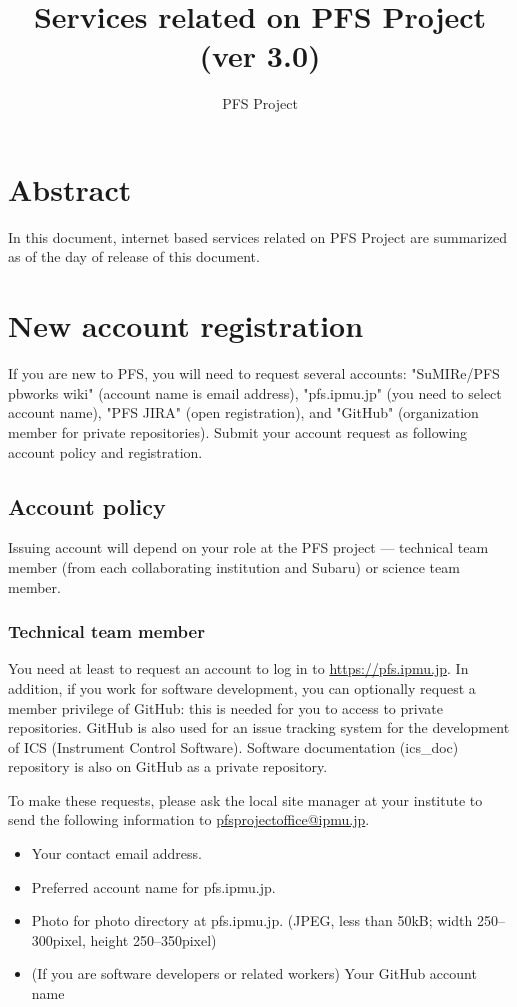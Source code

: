 \documentclass[a4paper,notitlepage]{article}
\title{Services related on PFS Project (ver 3.0)}
\author{PFS Project}
\begin{document}
\maketitle
\tableofcontents

\section{Abstract}

In this document, internet based services related on PFS Project are summarized 
as of the day of release of this document. 

\section{New account registration}

If you are new to PFS, you will need to request several accounts: 
"SuMIRe/PFS pbworks wiki" (account name is email address), 
"pfs.ipmu.jp" (you need to select account name), 
"PFS JIRA" (open registration), and 
"GitHub" (organization member for private repositories). 
Submit your account request as following account policy and registration. 

\subsection{Account policy}

Issuing account will depend on your role at the PFS project --- 
technical team member (from each collaborating institution and Subaru) 
or science team member. 

\subsubsection{Technical team member}

You need at least to request an account to log in to \url{https://pfs.ipmu.jp}.
In addition, if you work for software development, you can optionally 
request a member privilege of GitHub: this is needed for you to access 
to private repositories. 
GitHub is also used for an issue tracking system for the development of 
ICS (Instrument Control Software). Software documentation (ics\_doc) 
repository is also on GitHub as a private repository. 

To make these requests, please ask the local site manager at your institute 
to send the following information to \url{pfsprojectoffice@ipmu.jp}. 

\begin{itemize}
  \item Your contact email address.
  \item Preferred account name for pfs.ipmu.jp.
  \item Photo for photo directory at pfs.ipmu.jp. (JPEG, less than 50kB; width 
    250--300pixel, height 250--350pixel)
  \item (If you are software developers or related workers) Your GitHub account name
\end{itemize}
\end{document}
